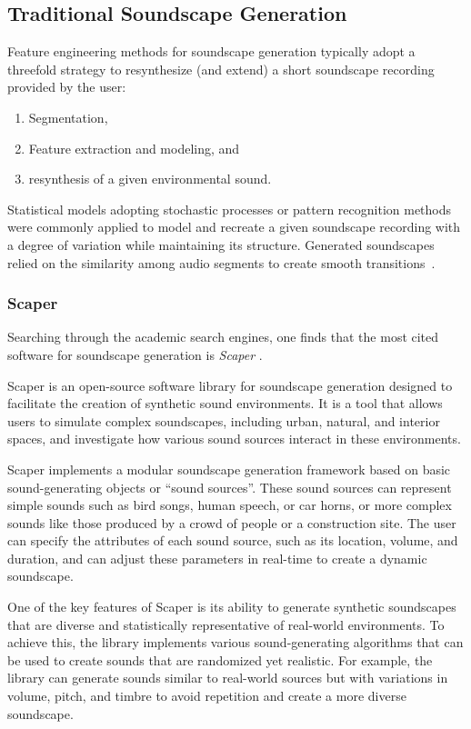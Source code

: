 \subsection{Traditional Soundscape Generation} \label{sec:trad-soundscape}

Feature engineering methods for soundscape generation typically adopt a threefold strategy to resynthesize (and extend) a short soundscape recording provided by the user:

\begin{enumerate}
    \item Segmentation,
    \item Feature extraction and modeling, and
    \item resynthesis of a given environmental sound.
\end{enumerate}

Statistical models adopting stochastic processes or pattern recognition methods were commonly applied to model and recreate a given soundscape recording with a degree of variation while maintaining its structure. Generated soundscapes relied on the similarity among audio segments to create smooth transitions~\cite{hoskinson_manipulation_2001}.

\subsubsection{Scaper}

Searching through the academic search engines, one finds that the most cited software for soundscape generation is \textit{Scaper} \cite{salamon_scaper_2017}.

Scaper is an open-source software library for soundscape generation designed to facilitate the creation of synthetic sound environments. It is a tool that allows users to simulate complex soundscapes, including urban, natural, and interior spaces, and investigate how various sound sources interact in these environments.

Scaper implements a modular soundscape generation framework based on basic sound-generating objects or ``sound sources''. These sound sources can represent simple sounds such as bird songs, human speech, or car horns, or more complex sounds like those produced by a crowd of people or a construction site. The user can specify the attributes of each sound source, such as its location, volume, and duration, and can adjust these parameters in real-time to create a dynamic soundscape.

One of the key features of Scaper is its ability to generate synthetic soundscapes that are diverse and statistically representative of real-world environments. To achieve this, the library implements various sound-generating algorithms that can be used to create sounds that are randomized yet realistic. For example, the library can generate sounds similar to real-world sources but with variations in volume, pitch, and timbre to avoid repetition and create a more diverse soundscape.


